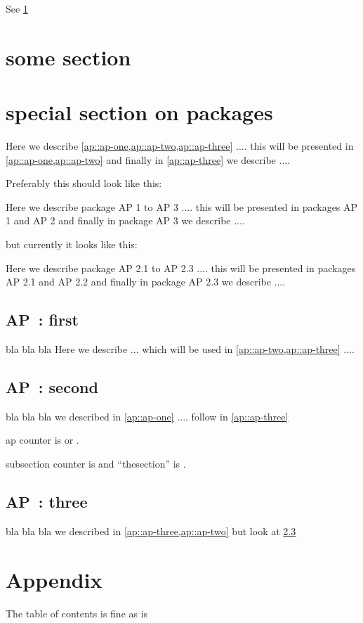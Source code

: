 \documentclass[10pt,a4paper,twoside]{article}
\begin{document}
See \cref{foosection}

  \section{ some section  } \label{foosection}
  \section{ special section on packages  }
  \setcounter{ap}{0}

      Here we describe \cref{ap::ap-one,ap::ap-two,ap::ap-three}  ....
      this will be presented in \cref{ap::ap-one,ap::ap-two} and 
      finally in \cref{ap::ap-three} we describe ....

    Preferably this should look like this:

      Here we describe package AP 1 to AP 3  .... 
      this will be presented in packages AP 1 and AP 2 and 
      finally in package AP 3 we describe ....

    but currently it looks like this:

      Here we describe package AP 2.1 to AP 2.3  .... 
      this will be presented in packages AP 2.1 and AP 2.2 and 
      finally in package AP 2.3 we describe ....

   \subsection{AP~: first } \label{ap-one}
     bla bla bla
     Here we describe  ... 
     which will be used in \cref{ap::ap-two,ap::ap-three}  ....


   \subsection{AP~: second }
   \label{ap-two}
     bla bla bla
     we described in \cref{ap::ap-one}  .... 
     follow in \cref{ap::ap-three}

     ap counter is  or \theap.

     subsection counter is  
     and ``thesection'' is \thesubsection.


   \subsection{AP~: three }
   \label{ap-three}
     bla bla bla
     we described in \cref{ap::ap-three,ap::ap-two} but look at \ref{ap-three}  


  \section*{Appendix}
     The table of contents is fine as is 
  \tableofcontents
\end{document}
